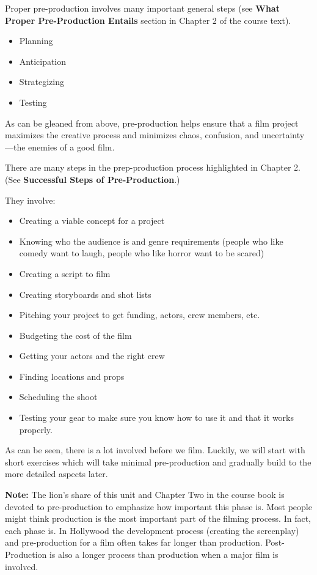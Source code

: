\documentclass[
]{book}
\providecommand{\tightlist}{%
  \setlength{\itemsep}{0pt}\setlength{\parskip}{0pt}}
\begin{document}
Proper pre-production involves many important general steps (see \textbf{What Proper Pre-Production Entails} section in Chapter 2 of the course text).

\begin{itemize}
\tightlist
\item
  Planning\\
\item
  Anticipation\\
\item
  Strategizing\\
\item
  Testing
\end{itemize}

As can be gleaned from above, pre-production helps ensure that a film project maximizes the creative process and minimizes chaos, confusion, and uncertainty---the enemies of a good film.

There are many steps in the prep-production process highlighted in Chapter 2. (See \textbf{Successful Steps of Pre-Production}.)

They involve:

\begin{itemize}
\item
  Creating a viable concept for a project
\item
  Knowing who the audience is and genre requirements (people who like comedy want to laugh, people who like horror want to be scared)
\item
  Creating a script to film
\item
  Creating storyboards and shot lists
\item
  Pitching your project to get funding, actors, crew members, etc.
\item
  Budgeting the cost of the film
\item
  Getting your actors and the right crew
\item
  Finding locations and props
\item
  Scheduling the shoot
\item
  Testing your gear to make sure you know how to use it and that it works properly.
\end{itemize}

As can be seen, there is a lot involved before we film. Luckily, we will start with short exercises which will take minimal pre-production and gradually build to the more detailed aspects later.

\begin{caution}
\textbf{Note:} The lion's share of this unit and Chapter Two in the course book is devoted to pre-production to emphasize how important this phase is. Most people might think production is the most important part of the filming process. In fact, each phase is. In Hollywood the development process (creating the screenplay) and pre-production for a film often takes far longer than production. Post-Production is also a longer process than production when a major film is involved.
\end{caution}
\end{document}
